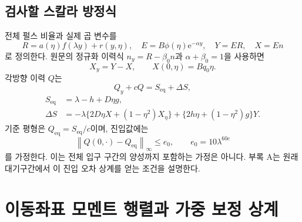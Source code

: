 \documentclass[11pt,a4paper]{article}
\theoremstyle{definition}
\theoremstyle{remark}\newtheorem{remark}[theorem]{주의}
\newcommand{\norm}[1]{\left\lVert #1\right\rVert}
\newcommand{\e}{\mathrm e}
\newcommand{\eq}{\mathrm{eq}}
\begin{document}
\subsection{검사할 스칼라 방정식}
전체 펄스 비율과 실제 곱 변수를
\begin{equation}
 R=a(\eta)f(\lambda y)+r(y,\eta),\quad
 E=B\phi(\eta)\e^{-\alpha y},\quad Y=ER,\quad X=En
\end{equation}
로 정의한다. 원문의 정규화 이력식 $n_y=R-\beta_0n$과 $\alpha+\beta_0=1$을 사용하면\cite{cone}
\begin{equation}\label{Xode}
 X_y=Y-X,\qquad X(0,\eta)=Bq_0\eta.
\end{equation}
각방향 이력 $Q$는
\begin{equation}\label{Qode}
Q_y+cQ=S_\eq+\Delta S,
\end{equation}
\begin{align}\label{source}
 S_\eq&=\lambda-h+D\eta g,\\
 \Delta S&=-\lambda\{2D\eta X+(1-\eta^2)X_\eta\}
       +\{2h\eta+(1-\eta^2)g\}Y.\nonumber
\end{align}
기준 평형은 $Q_\eq=S_\eq/c$이며, 진입값에는
\begin{equation}\label{entry}
 \norm{Q(0,\cdot)-Q_\eq}_\infty\le e_0,
 \qquad e_0=10\lambda^{60c}
\end{equation}
를 가정한다. 이는 전체 입구 구간의 양성까지 포함하는 가정은 아니다. 부록 A는 원래 대기구간에서 이 진입 오차 상계를 얻는 조건을 설명한다.

\section{이동좌표 모멘트 행렬과 가중 보정 상계}
\end{document}
